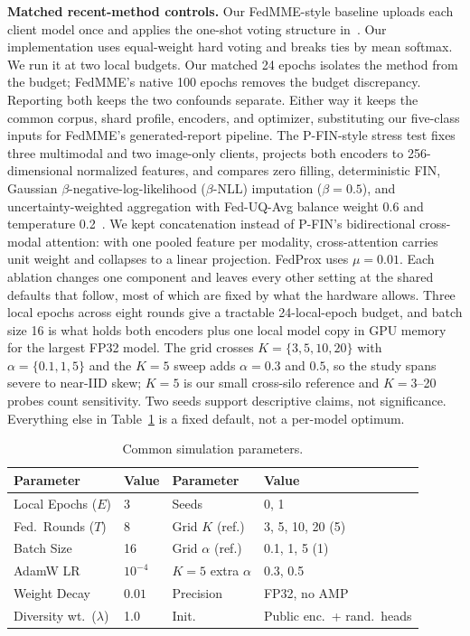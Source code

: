 \documentclass[letterpaper, conference]{IEEEtran}
\begin{document}
\textbf{Matched recent-method controls.}
Our FedMME-style baseline uploads each client model once and applies the one-shot
voting structure in~\cite{Wang2025fedmme}. Our implementation uses equal-weight hard
voting and breaks ties by mean softmax. We run it at two local
budgets. Our matched 24 epochs isolates the method from the budget; FedMME's native
100 epochs removes the budget discrepancy. Reporting both keeps the two confounds
separate. Either way it keeps the common corpus,
shard profile, encoders, and optimizer, substituting our five-class inputs for
FedMME's generated-report pipeline. The P-FIN-style stress test fixes
three multimodal and two image-only clients, projects both encoders to
256-dimensional normalized features, and compares zero filling, deterministic FIN,
Gaussian $\beta$-negative-log-likelihood ($\beta$-NLL) imputation ($\beta{=}0.5$),
and uncertainty-weighted aggregation with Fed-UQ-Avg balance weight 0.6 and
temperature 0.2~\cite{Shahid2026pfin}. We kept concatenation instead of P-FIN's
bidirectional cross-modal attention: with one pooled feature per modality,
cross-attention carries unit weight and collapses to a linear projection. FedProx
uses $\mu{=}0.01$. Each ablation changes one component and leaves every other
setting at the shared defaults that follow, most of which are fixed by what the
hardware allows. Three local epochs across eight rounds
give a tractable 24-local-epoch budget, and batch size 16 is what holds both encoders
plus one local model copy in GPU memory for the largest FP32 model. The grid crosses $K{=}\{3,5,10,20\}$ with $\alpha{=}\{0.1,1,5\}$ and the
$K{=}5$ sweep adds $\alpha{=}0.3$ and $0.5$, so the study spans severe to near-IID
skew; $K{=}5$ is our small cross-silo reference and $K{=}3$--20 probes count
sensitivity. Two seeds support descriptive claims, not significance. Everything else
in Table~\ref{tab:hyper} is a fixed default, not a per-model optimum.

\begin{table}[t]
\caption{Common simulation parameters.}
\label{tab:hyper}
\centering\footnotesize
\setlength{\tabcolsep}{4pt}
\begin{tabular}{llll}
\toprule
\textbf{Parameter} & \textbf{Value} & \textbf{Parameter} & \textbf{Value} \\
\midrule
Local Epochs ($E$)   & 3      & Seeds                    & 0, 1 \\
Fed.\ Rounds ($T$)   & 8      & Grid $K$ (ref.)          & 3, 5, 10, 20 (5) \\
Batch Size           & 16     & Grid $\alpha$ (ref.)     & 0.1, 1, 5 (1) \\
AdamW LR             & $10^{-4}$ & $K{=}5$ extra $\alpha$ & 0.3, 0.5 \\
Weight Decay         & $0.01$ & Precision                & FP32, no AMP \\
Diversity wt.\ ($\lambda$) & 1.0 & Init.                & Public enc.\ + rand.\ heads \\
\bottomrule
\end{tabular}
\end{table}
\end{document}
